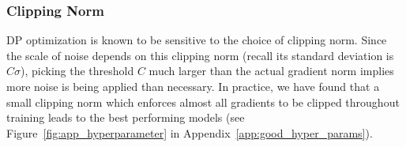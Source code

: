 
\subsubsection{Clipping Norm}
DP optimization is known to be sensitive to the choice of clipping norm.
Since the scale of noise depends on this clipping norm (recall its standard deviation is $C \sigma$), picking the threshold $C$ much larger than the actual gradient norm implies more noise is being applied than necessary.
In practice, we have found that a small clipping norm which enforces almost all gradients to be clipped throughout training leads to the best performing models (see Figure~\ref{fig:app_hyperparameter} in Appendix~\ref{app:good_hyper_params}).
